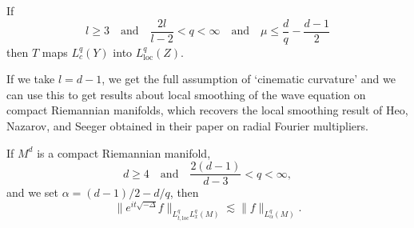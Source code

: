\begin{theorem}
    If
    \[ l \geq 3 \quad\text{and}\quad \frac{2l}{l-2} < q < \infty \quad\text{and}\quad \mu \leq \frac{d}{q} - \frac{d-1}{2} \]
    then $T$ maps $L^q_c(Y)$ into $L^q_{\text{loc}}(Z)$.
\end{theorem}

If we take $l = d-1$, we get the full assumption of `cinematic curvature' and we can use this to get results about local smoothing of the wave equation on compact Riemannian manifolds, which recovers the local smoothing result of Heo, Nazarov, and Seeger obtained in their paper on radial Fourier multipliers.

\begin{theorem}
    If $M^d$ is a compact Riemannian manifold,
    \[ d \geq 4 \quad\text{and}\quad \frac{2(d-1)}{d - 3} < q < \infty, \]
    and we set $\alpha = (d-1)/2 - d/q$, then
    \[ \| e^{it \sqrt{-\Delta}} f \|_{L^q_{t,\text{loc}} L^q_x(M)} \lesssim \| f \|_{L^q_\alpha(M)}. \]
\end{theorem}
